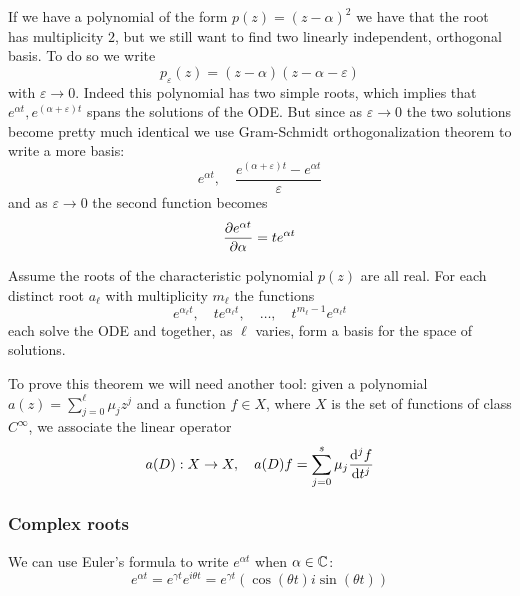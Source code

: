 \documentclass[12pt]{extarticle}
\begin{document}
If we have a polynomial of the form $p(z) = (z - \alpha)^2$ we have that the root has multiplicity $2$, but we still want to find two linearly independent, orthogonal basis.
To do so we write
\begin{equation}
    p_\varepsilon(z) = (z-\alpha)(z-\alpha - \varepsilon)
\end{equation}
with $\varepsilon \to 0$.
Indeed this polynomial has two simple roots, which implies that $e^{\alpha t}, e^{(\alpha + \varepsilon) t}$ spans the solutions of the ODE.
But since as $\varepsilon \to 0$ the two solutions become pretty much identical we use Gram-Schmidt orthogonalization
theorem to write a more  basis:
\begin{equation}
    e^{\alpha t}, \quad \frac{e^{(\alpha + \varepsilon)t} - e^{\alpha t}}{\varepsilon}
\end{equation}
and as $\varepsilon \to 0$ the second function becomes
\begin{equation}
    \pdv{e^{\alpha t}}{\alpha} = t e ^{\alpha t}
\end{equation}

\begin{theorem}{}{}
    Assume the roots of the characteristic polynomial $p(z)$ are all real.
    For each distinct root $a_\ell$ with multiplicity $m_\ell$ the functions
    \begin{equation}
        e^{\alpha_\ell t}, \quad t e^{\alpha_\ell t}, \quad \ldots, \quad t^{m_\ell -1} e^{\alpha_\ell t}
    \end{equation}
    each solve the ODE and together, as $\ell$ varies, form a basis for the space of solutions.
\end{theorem}

To prove this theorem we will need another tool:
given a polynomial $a(z) = \sum^\ell_{j = 0} \mu_j z^j$ and a function $f \in X$, where $X$ is the set of functions of class $C^\infty$, we associate the linear operator
\begin{equation}
    a(D): X \to X, \quad a(D) f = \sum_{j = 0}^{s} \mu_j \dv[j]{f}{t}
\end{equation}

\subsubsection{Complex roots}

We can use Euler's formula to write $e^{\alpha t}$ when $\alpha \in \mathbb{C}$:
\begin{equation}
    e^{\alpha t} = e^{\gamma t}e^{i \theta t} = e^{\gamma t}(\cos(\theta t) i \sin (\theta t))
\end{equation}
\end{document}
